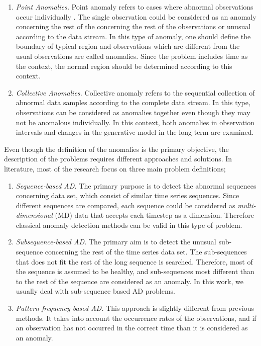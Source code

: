 \begin{enumerate}
    \item {\it Point Anomalies.} 
    Point anomaly refers to cases where abnormal observations occur individually \cite{hawkins2002outlier}.
    The single observation could be considered as an anomaly concerning the rest of the concerning the rest of the observations or unusual according to the data stream.
    In this type of anomaly, one should define the boundary of typical region and observations which are different from the usual observations are called anomalies. 
    Since the problem includes time as the context, the normal region should be determined according to this context.
    
    \item {\it Collective Anomalies.} 
    Collective anomaly refers to the sequential collection of abnormal data samples according to the complete data stream\cite{chandola2009anomaly}.
    In this type, observations can be considered as anomalies together even though they may not be anomalous individually.
    In this context, both anomalies in observation intervals and changes in the generative model in the long term are examined.
\end{enumerate}

Even though the definition of the anomalies is the primary objective, the description of the problems requires different approaches and solutions. 
In literature, most of the research focus on three main problem definitions;

\begin{enumerate}
    \item {\it Sequence-based AD.}
    The primary purpose is to detect the abnormal sequences concerning data set, which consist of similar time series sequences.
    Since different sequences are compared, each sequence could be considered as {\it multi-dimensional} (MD) data that accepts each timestep as a dimension.
    Therefore classical anomaly detection methods can be valid in this type of problem.
    
    \item {\it Subsequence-based AD.}
    The primary aim is to detect the unusual sub-sequence concerning the rest of the time series data set. 
    The sub-sequences that does not fit the rest of the long sequence is searched.
    Therefore, most of the sequence is assumed to be healthy, and sub-sequences most different than to the rest of the sequence are considered as an anomaly. 
    In this work, we usually deal with sub-sequence based AD problems.
    
    \item {\it Pattern frequency based AD.}
    This approach is slightly different from previous methods. 
    It takes into account the occurrence rates of the observations, and if an observation has not occurred in the correct time than it is considered as an anomaly.
\end{enumerate}

